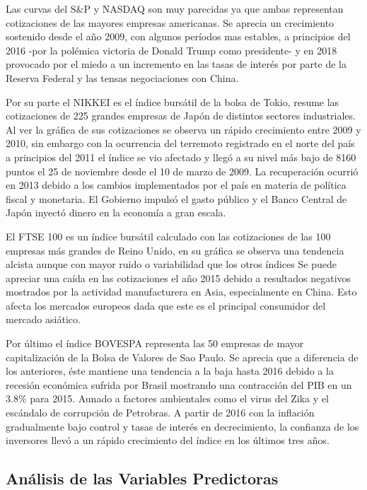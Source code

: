 \documentclass[a4paper,12pt]{Latex/Classes/PhDthesisPSnPDF}
\begin{document}
Las curvas del S\&P y NASDAQ son muy parecidas ya que ambas representan cotizaciones de las mayores empresas americanas. Se aprecia un crecimiento sostenido desde el año 2009, con algunos períodos mas estables, a principios del 2016 -por la polémica victoria de Donald Trump como presidente- y en 2018 provocado por el miedo a un incremento en las tasas de interés por parte de la Reserva Federal y las tensas negociaciones con China.

Por su parte el NIKKEI es el índice bursátil de la bolsa de Tokio, resume las cotizaciones de 225 grandes empresas de Japón de distintos sectores industriales. Al ver la gráfica de sus cotizaciones se observa un rápido crecimiento entre 2009 y 2010, sin embargo con la ocurrencia del terremoto registrado en el norte del país a principios del 2011 el índice se vio afectado y llegó a su nivel más bajo de 8160 puntos el 25 de noviembre desde el 10 de marzo de 2009. La recuperación ocurrió en 2013 debido a los cambios implementados por el país en materia de política fiscal y monetaria. El Gobierno impulsó el gasto público y el Banco Central de Japón inyectó dinero en la economía a gran escala.

El FTSE 100 es un índice bursátil calculado con las cotizaciones de las 100 empresas más grandes de Reino Unido, en su gráfica se observa una tendencia alcista aunque con mayor ruido o variabilidad que los otros índices Se puede apreciar una caída en las cotizaciones el año 2015 debido a resultados negativos mostrados por la actividad manufacturera en Asia, especialmente en China. Esto afecta los mercados europeos dada que este es el principal consumidor del mercado asiático.

Por último el índice BOVESPA representa las 50 empresas de mayor capitalización de la Bolsa de Valores de Sao Paulo. Se aprecia que a diferencia de los anteriores, éste mantiene una tendencia a la baja hasta 2016 debido a la recesión económica sufrida por Brasil mostrando una contracción del PIB en un 3.8\% para 2015. Aunado a factores ambientales como el virus del Zika y el escándalo de corrupción de Petrobras. A partir de 2016 con la inflación gradualmente bajo control y tasas de interés en decrecimiento, la confianza de los inversores llevó a un rápido crecimiento del índice en los últimos tres años.

\subsection{Análisis de las Variables Predictoras}
\end{document}
